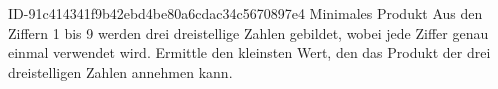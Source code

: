 \begin{exercise}
      {ID-91c414341f9b42ebd4be80a6cdac34c5670897e4}
      {Minimales Produkt}
  \ifproblem\problem
    Aus den Ziffern 1 bis 9 werden drei dreistellige Zahlen gebildet, wobei
    jede Ziffer genau einmal verwendet wird. Ermittle den kleinsten Wert,
    den das Produkt der drei dreistelligen Zahlen annehmen kann.
  \fi
\end{exercise}
